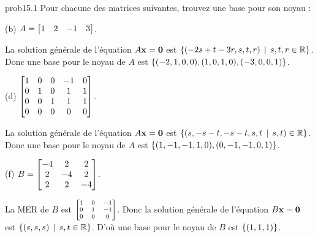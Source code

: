 \begin{sol}{prob15.1} Pour chacune des matrices suivantes, trouvez une base pour son noyau :

\medskip
(b) $A=\bmatrix  1 & 2 & -1 & 3 \endbmatrix$.

\soln La solution générale de l'équation $A\mathbf{x}=\mathbf{0}$ est $\{(-2s+t-3r,s,t,r)\, \mid \, s,t,r\in \mathbb{R}\}$. Donc une base pour le noyau de $A$ est $\{(-2,1,0,0), (1,0,1,0),(-3,0,0,1)\} $.
\medskip

(d) $ \bmatrix 
1& 0& 0& -1& 0\\  
0& 1& 0& 1&1\\ 
0& 0& 1& 1& 1\\ 
0& 0& 0& 0& 0\endbmatrix$.

\soln La solution générale de l'équation $A\mathbf{x}=\mathbf{0}$ est  $\{(s,-s-t,-s-t,s,t\, \mid \, s,t)\in \mathbb{R}\}$. Donc une base pour le noyau de $A$ est $\{(1,-1,-1,1,0), (0,-1,-1,0,1)\} $.
\medskip


(f)  $B=\bmatrix
-4&2&2\\ 2&-4&2\\ 2&2&-4 \endbmatrix$.

\soln La MER de $B$ est $\scriptsize\bmatrix 1 & 0 & -1 \\
 0 & 1 & -1 \\
 0 & 0 & 0 \endbmatrix$. Donc la solution générale de l'équation $B\mathbf{x}=\mathbf{0}$ est $\{(s,s,s)\, \mid \, s,t\in \mathbb{R}\}$. D'o\`u une base pour le noyau de $B$ est  $\{(1,1,1)\} $.
\medskip
\end{sol}

